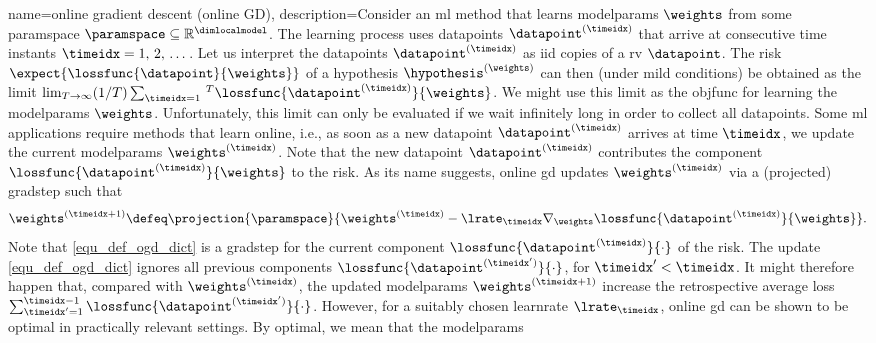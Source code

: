 {name={online gradient descent (online GD)}, 
	description={Consider  an \gls{ml} method that learns \glspl{modelparam} 
		$\weights$ from some \gls{paramspace} $\paramspace \subseteq \mathbb{R}^{\dimlocalmodel}$. 
		The learning process uses \glspl{datapoint} $\datapoint^{(\timeidx)}$ that arrive at consecutive time instants $\timeidx=1, \,2, \,\dots$. 
		Let us interpret the \glspl{datapoint} $\datapoint^{(\timeidx)}$ as \gls{iid} copies 
		of a \gls{rv} $\datapoint$. The \gls{risk} $\expect\{ \lossfunc{\datapoint}{\weights} \}$ of a 
		\gls{hypothesis} $\hypothesis^{(\weights)}$ can then (under mild conditions) be obtained as the limit 
		$\lim_{T\rightarrow \infty} (1/T)\sum_{\timeidx=1}\,^{T} \lossfunc{\datapoint^{(\timeidx)}}{\weights}$. 
		We might use this limit as the \gls{objfunc} for learning the \glspl{modelparam} $\weights$. 
		Unfortunately, this limit can only be evaluated if we wait infinitely long in order to collect all \glspl{datapoint}. 
		Some \gls{ml} applications require methods that learn online, i.e., as soon as a new \gls{datapoint} $\datapoint^{(\timeidx)}$ 
		arrives at time $\timeidx$, we update the current \glspl{modelparam} $\weights^{(\timeidx)}$. Note that 
		the new \gls{datapoint} $\datapoint^{(\timeidx)}$ contributes the component $\lossfunc{\datapoint^{(\timeidx)}}{\weights}$ 
		to the \gls{risk}. As its name suggests, online \gls{gd} updates $\weights^{(\timeidx)}$ via a (projected) \gls{gradstep} such that
		\begin{equation} 
			\label{equ_def_ogd_dict}
 			\weights^{(\timeidx+1)} \defeq \projection{\paramspace}{\weights^{(\timeidx)} - \lrate_{\timeidx} \nabla_{\weights} \lossfunc{\datapoint^{(\timeidx)}}{\weights}}. 
		\end{equation} 
		Note that \eqref{equ_def_ogd_dict} is a \gls{gradstep} for the current component $\lossfunc{\datapoint^{(\timeidx)}}{\cdot}$ 
		of the \gls{risk}. The update \eqref{equ_def_ogd_dict} ignores all previous components $\lossfunc{\datapoint^{(\timeidx')}}{\cdot}$, 
		for $\timeidx' < \timeidx$. It might therefore happen that, compared with $\weights^{(\timeidx)}$, the updated \glspl{modelparam} 
		$\weights^{(\timeidx+1)}$ increase the retrospective average \gls{loss} $\sum_{\timeidx'=1}^{\timeidx-1} \lossfunc{\datapoint^{(\timeidx')}}{\cdot}$. 
		However, for a suitably chosen \gls{learnrate} $\lrate_{\timeidx}$, online \gls{gd} can be shown 
		to be optimal in practically relevant settings. By optimal, we mean that the \glspl{modelparam} 
}}

